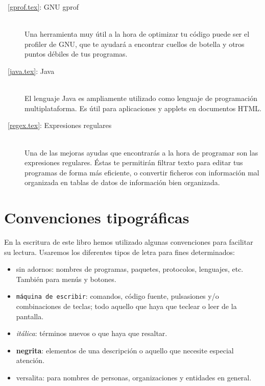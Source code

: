 \begin{description}
\item[\chaptername~\ref{gprof.tex}: GNU gprof] ~\\ Una herramienta muy
útil a la  hora de optimizar tu  código puede ser el  profiler de GNU,
que te ayudará  a encontrar cuellos de botella y  otros puntos débiles
de tus programas.

\item[\chaptername~\ref{java.tex}:  Java]  ~\\  El  lenguaje  Java  es
ampliamente utilizado  como lenguaje de  programación multiplataforma.
Es útil para aplicaciones y applets en documentos HTML.

\item[\chaptername~\ref{regex.tex}: Expresiones regulares]  ~\\ Una de
las mejoras  ayudas que  encontrarás a  la hora  de programar  son las
expresiones regulares.  Éstas te permitirán filtrar  texto para editar
tus  programas  de  forma  más eficiente,  o  convertir  ficheros  con
información  mal organizada  en tablas  de datos  de información  bien
organizada.


\end{description}

\section*{Convenciones tipográficas}
\label{convenciones_tipograficas}

En la escritura de este libro hemos utilizado algunas convenciones
para facilitar su lectura. Usaremos los diferentes tipos de letra para
fines determinados:

\begin{itemize}

\item {\sf  sin adornos}: nombres de  programas, paquetes, protocolos,
lenguajes, etc. También para menús y botones.

\item {\tt máquina de  escribir}: comandos, código fuente, pulsasiones
y/o combinaciones de teclas; todo aquello  que haya que teclear o leer
de la pantalla.

\item {\em itálica}: términos nuevos o que haya que resaltar.

\item  {\bf  negrita}: elementos  de  una  descripción o  aquello  que
necesite especial atención.

\item  {\sc versalita}:  para  nombres de  personas, organizaciones  y
entidades en general.

\end{itemize}

